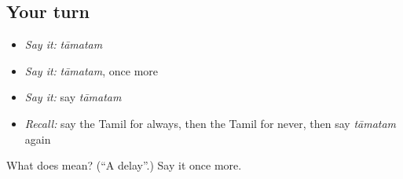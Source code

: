 \subsection*{Your turn}
\begin{itemize}
\raggedright
  \item \emph{Say it:} \emph{tāmatam}
  \item \emph{Say it:} \emph{tāmatam}, once more
  \item \emph{Say it:} say \emph{tāmatam}
  \item \emph{Recall:} say the Tamil for always, then the Tamil for never, then say \emph{tāmatam} again
\end{itemize}

\begin{tcolorbox}[breakable,colback=teal!4,colframe=teal!35!black,title={Before you move on}]
What does  mean? (\textquotedblleft{}A delay\textquotedblright{}.) Say it once more.
\end{tcolorbox}

